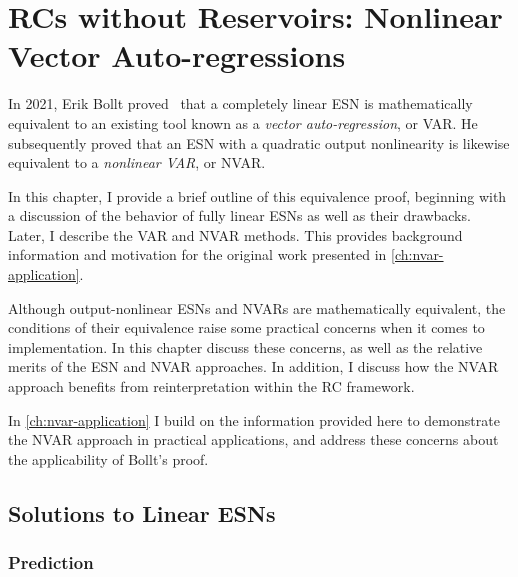 \chapter{RCs without Reservoirs: Nonlinear Vector Auto-regressions}\label{ch:nvar}

In 2021, Erik Bollt proved~\cite{bollt2021} that a completely linear
ESN is mathematically equivalent to an existing tool known as a \emph{vector
auto-regression}, or VAR. He subsequently proved that an ESN with a
quadratic output nonlinearity is likewise equivalent to a
\emph{nonlinear VAR}, or NVAR.

In this chapter, I provide a brief outline of this equivalence proof,
beginning with a discussion of the behavior of fully linear ESNs as
well as their drawbacks. Later, I describe the VAR and NVAR
methods. This provides background information and motivation for the
original work presented in \cref{ch:nvar-application}.

Although output-nonlinear ESNs and NVARs are mathematically
equivalent, the conditions of their equivalence raise some practical
concerns when it comes to implementation. In this chapter discuss
these concerns, as well as the relative merits of the ESN and NVAR
approaches. In addition, I discuss how the NVAR approach benefits from
reinterpretation within the RC framework.

In \cref{ch:nvar-application} I build on the information provided
here to demonstrate the NVAR approach in practical applications, and
address these concerns about the applicability of Bollt's proof.

\section{Solutions to Linear ESNs}

\subsection{Prediction}

